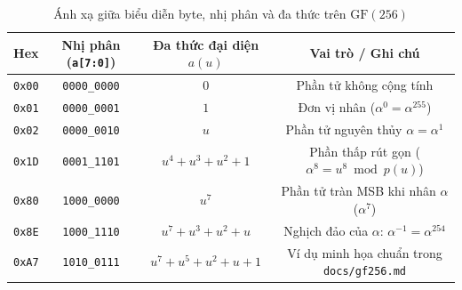 \documentclass[12pt,a4paper]{report}
\begin{document}
\begin{table}[!htb]
    \centering
    \caption{Ánh xạ giữa biểu diễn byte, nhị phân và đa thức trên $\text{GF}(256)$}
    \label{tab:gf-poly-map}
    \begin{tabular}{@{}cccc@{}}
        \toprule
        \textbf{Hex} & \textbf{Nhị phân (\texttt{a[7:0]})} & \textbf{Đa thức đại diện $a(u)$} & \textbf{Vai trò / Ghi chú} \\
        \midrule
        \texttt{0x00} & \texttt{0000\_0000} & $0$ & Phần tử không cộng tính \\
        \texttt{0x01} & \texttt{0000\_0001} & $1$ & Đơn vị nhân ($\alpha^0 = \alpha^{255}$) \\
        \texttt{0x02} & \texttt{0000\_0010} & $u$ & Phần tử nguyên thủy $\alpha = \alpha^1$ \\
        \texttt{0x1D} & \texttt{0001\_1101} & $u^4 + u^3 + u^2 + 1$ & Phần thấp rút gọn ($\alpha^8 = u^8 \bmod p(u)$) \\
        \texttt{0x80} & \texttt{1000\_0000} & $u^7$ & Phần tử tràn MSB khi nhân $\alpha$ ($\alpha^7$) \\
        \texttt{0x8E} & \texttt{1000\_1110} & $u^7 + u^3 + u^2 + u$ & Nghịch đảo của $\alpha$: $\alpha^{-1} = \alpha^{254}$ \\
        \texttt{0xA7} & \texttt{1010\_0111} & $u^7 + u^5 + u^2 + u + 1$ & Ví dụ minh họa chuẩn trong \texttt{docs/gf256.md} \\
        \bottomrule
    \end{tabular}
\end{table}
\end{document}
